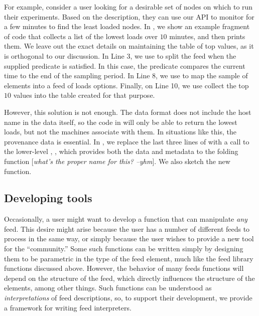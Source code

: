For example, consider a \planetlab user looking for a desirable set of nodes on which to run their experiments. Based on the \comon description, they can use our API to monitor \planetlab for a few minutes to find the least loaded nodes. In , we show an example fragment of \ocaml code that collects a list of the lowest loads over $10$ minutes, and then prints them. We leave out the exact details on maintaining the table of top values, as it is orthogonal to our 
discussion. In Line 3, we use  to split the feed when the supplied predicate is satisfied. In this case, the predicate compares the current time to the end of the sampling period. In Line 8, we use  to map the sample of \comon elements into a feed of loads options. Finally, on Line 10, we use  collect the top $10$ values into the table created for that purpose.

However, this solution is not enough. The \monall data format does not include the host name in the data itself, so the code in  will only be able to return the lowest loads, but not the machines associate with them. In situations like this, the provenance data is essential.  In , we  replace the last three lines of  with a call to the lower-level , , which provides both the data and metadata to the folding function [{\it what's the proper name for this? --yhm}]. We also sketch the new  function.


\subsection{Developing tools}


Occasionally, a user might want to develop a function that can manipulate {\it any} feed. This desire might arise because the user has a number of different feeds to process in the same way, or simply because the user wishes to provide a new tool for the \padsd{} ``community.'' Some such functions can be written simply by designing them to be parametric in the type of the feed element, much like the feed library functions discussed above. However, the behavior of many feeds functions will depend on the structure of the feed, which directly influences the structure of the elements, among other things. Such functions can be understood as {\it interpretations} of feed descriptions, so, to support their development, we provide a framework for writing feed interpreters.

